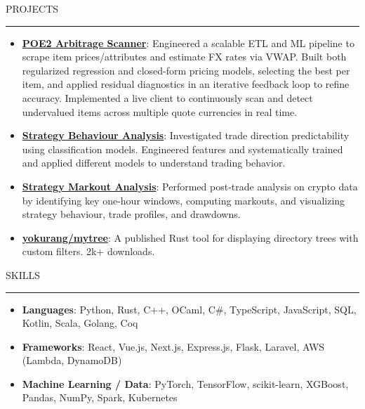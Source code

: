 \documentclass[letterpaper, 11pt]{article}
\def\sectionlineskip{\medskip}
\def\sectionskip{\medskip}
\def \entryspacing {-0pt}
\newcommand{\SectionHeading}[1]{
  \sectionskip
  \raggedright\raggedbottom\MakeUppercase{\large{#1}}
  \sectionlineskip
  \hrule
  \color{black}
}
\newcommand{\ResumeItem}[2]{
  \item{
    \textbf{#1}{: #2 \vspace{-2.835pt}}
  }
}
\newcommand{\ResumeProjectItem}[3]{
  \item{
    \href{#2}{\textbf{#1}}{: #3 \vspace{-2.835pt}}
  }
}
\newcommand{\ResumeEntryStart}{\begin{itemize}[leftmargin=0mm, label={}]}
\newcommand{\ResumeEntryEnd}{\end{itemize}\vspace{-2.835pt}} %
\newcommand{\ProjectItemListStart}{\begin{itemize}[leftmargin=*, label=$\bullet$]}
\newcommand{\ProjectItemListEnd}{\end{itemize}\vspace{\entryspacing}}
\begin{document}
  \SectionHeading{Projects}
  \ProjectItemListStart
  \ResumeProjectItem{POE2 Arbitrage Scanner}
  {https://github.com/yokurang/path-of-elixe}
  {Engineered a scalable ETL and ML pipeline to scrape item prices/attributes and estimate FX rates via VWAP. Built both regularized regression and closed-form pricing models, selecting the best per item, and applied residual diagnostics in an iterative feedback loop to refine accuracy. Implemented a live client to continuously scan and detect undervalued items across multiple quote currencies in real time.}
  \ResumeProjectItem{Strategy Behaviour Analysis}
  {https://github.com/yokurang/trading-strategy-behavior-analysis}
  {Investigated trade direction predictability using classification models.
  Engineered features and systematically trained and applied different models to understand trading behavior.}
  \ResumeProjectItem{Strategy Markout Analysis}
  {https://github.com/yokurang/trading-strategy-markout-analysis}
  {Performed post-trade analysis on crypto data by identifying key one-hour windows, computing markouts, and visualizing strategy behaviour, trade profiles, and drawdowns.}
  \ResumeProjectItem{yokurang/mytree}
  {https://github.com/yokurang/mytree}
  {A published Rust tool for displaying directory trees with custom filters. 2k+ downloads.}
  \ProjectItemListEnd

  \SectionHeading{Skills}
  \ResumeEntryStart
    \ResumeItem{Languages}{ Python, Rust, C++, OCaml, C\#, TypeScript, JavaScript, SQL, Kotlin, Scala, Golang, Coq }
    \ResumeItem{Frameworks}{ React, Vue.js, Next.js, Express.js, Flask, Laravel, AWS (Lambda, DynamoDB) }
    \ResumeItem{Machine Learning / Data}{ PyTorch, TensorFlow, scikit-learn, XGBoost, Pandas, NumPy, Spark, Kubernetes }
  \ResumeEntryEnd
\end{document}
